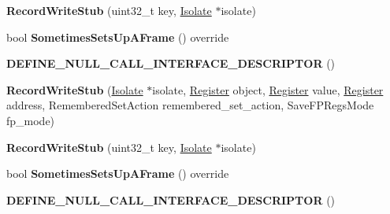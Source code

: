 \begin{DoxyCompactItemize}
\item 
{\bfseries Record\+Write\+Stub} (uint32\+\_\+t key, \hyperlink{classv8_1_1internal_1_1_isolate}{Isolate} $\ast$isolate)\hypertarget{classv8_1_1internal_1_1_record_write_stub_a9442f95c68a538cf8d22e7f5a7a247b5}{}\label{classv8_1_1internal_1_1_record_write_stub_a9442f95c68a538cf8d22e7f5a7a247b5}

\item 
bool {\bfseries Sometimes\+Sets\+Up\+A\+Frame} () override\hypertarget{classv8_1_1internal_1_1_record_write_stub_a636954d69a10f35b09d319f92e167699}{}\label{classv8_1_1internal_1_1_record_write_stub_a636954d69a10f35b09d319f92e167699}

\item 
{\bfseries D\+E\+F\+I\+N\+E\+\_\+\+N\+U\+L\+L\+\_\+\+C\+A\+L\+L\+\_\+\+I\+N\+T\+E\+R\+F\+A\+C\+E\+\_\+\+D\+E\+S\+C\+R\+I\+P\+T\+OR} ()\hypertarget{classv8_1_1internal_1_1_record_write_stub_a886f020173ce417f40c5704f6a582d6f}{}\label{classv8_1_1internal_1_1_record_write_stub_a886f020173ce417f40c5704f6a582d6f}

\item 
{\bfseries Record\+Write\+Stub} (\hyperlink{classv8_1_1internal_1_1_isolate}{Isolate} $\ast$isolate, \hyperlink{structv8_1_1internal_1_1_register}{Register} object, \hyperlink{structv8_1_1internal_1_1_register}{Register} value, \hyperlink{structv8_1_1internal_1_1_register}{Register} address, Remembered\+Set\+Action remembered\+\_\+set\+\_\+action, Save\+F\+P\+Regs\+Mode fp\+\_\+mode)\hypertarget{classv8_1_1internal_1_1_record_write_stub_a6f773cf58e28bfb7b2c5da464fd3f145}{}\label{classv8_1_1internal_1_1_record_write_stub_a6f773cf58e28bfb7b2c5da464fd3f145}

\item 
{\bfseries Record\+Write\+Stub} (uint32\+\_\+t key, \hyperlink{classv8_1_1internal_1_1_isolate}{Isolate} $\ast$isolate)\hypertarget{classv8_1_1internal_1_1_record_write_stub_a9442f95c68a538cf8d22e7f5a7a247b5}{}\label{classv8_1_1internal_1_1_record_write_stub_a9442f95c68a538cf8d22e7f5a7a247b5}

\item 
bool {\bfseries Sometimes\+Sets\+Up\+A\+Frame} () override\hypertarget{classv8_1_1internal_1_1_record_write_stub_a636954d69a10f35b09d319f92e167699}{}\label{classv8_1_1internal_1_1_record_write_stub_a636954d69a10f35b09d319f92e167699}

\item 
{\bfseries D\+E\+F\+I\+N\+E\+\_\+\+N\+U\+L\+L\+\_\+\+C\+A\+L\+L\+\_\+\+I\+N\+T\+E\+R\+F\+A\+C\+E\+\_\+\+D\+E\+S\+C\+R\+I\+P\+T\+OR} ()\hypertarget{classv8_1_1internal_1_1_record_write_stub_a886f020173ce417f40c5704f6a582d6f}{}\label{classv8_1_1internal_1_1_record_write_stub_a886f020173ce417f40c5704f6a582d6f}


\end{DoxyCompactItemize}
